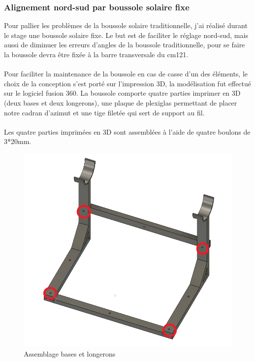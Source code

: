 \documentclass[12pt,a4paper]{article}
\begin{document}
\begin{flushleft}
\subsubsection{Alignement nord-sud par boussole solaire fixe}   

Pour pallier les problèmes de la boussole solaire traditionnelle, j'ai réalisé durant le stage une boussole solaire fixe. Le but est de faciliter le réglage nord-sud, mais aussi de diminuer les erreurs d'angles de la boussole traditionnelle, pour se faire la boussole devra être fixée à la barre transversale du cm121.\\
~\\
Pour faciliter la maintenance de la boussole en cas de casse d'un des éléments, le choix de la conception s'est porté sur l'impression 3D, la modélisation fut effectué sur le logiciel fusion 360. La boussole comporte quatre parties imprimer en 3D (deux bases et deux longerons), une plaque de plexiglas permettant de placer notre cadran d'azimut et une tige filetée qui sert de support au fil.\\
~\\
Les quatre parties imprimées en 3D sont assemblées à l'aide de quatre boulons de 3*20mm.\\

\begin{figure}[H]
\centering
\includegraphics[width=12cm]{image/montage/boussole_solaire/2.png} 
\caption{Assemblage bases et longerons}
\end{figure}


\end{flushleft}
\end{document}
